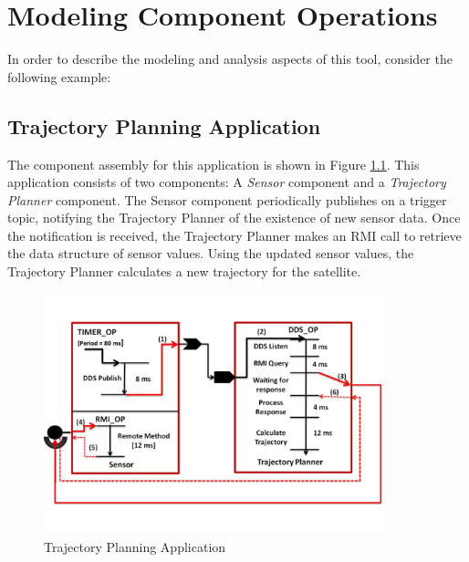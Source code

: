\chapter{Modeling Component Operations}

In order to describe the modeling and analysis aspects of this tool, consider the following example: 

\section{Trajectory Planning Application}

The component assembly for this application is shown in Figure \ref{fig:tpa}. This application consists of two components: A \emph{Sensor} component and a \emph{Trajectory Planner} component. The Sensor component periodically publishes on a trigger topic, notifying the Trajectory Planner of the existence of new sensor data. Once the notification is received, the Trajectory Planner makes an RMI call to retrieve the data structure of sensor values. Using the updated sensor values, the Trajectory Planner calculates a new trajectory for the satellite. 

\begin{figure}[ht]
\centering
\includegraphics[width=0.88\textwidth]{./figs/CPN_TPA}
\caption{Trajectory Planning Application}
\label{fig:tpa}
\vspace{-0.2in}
\end{figure}

